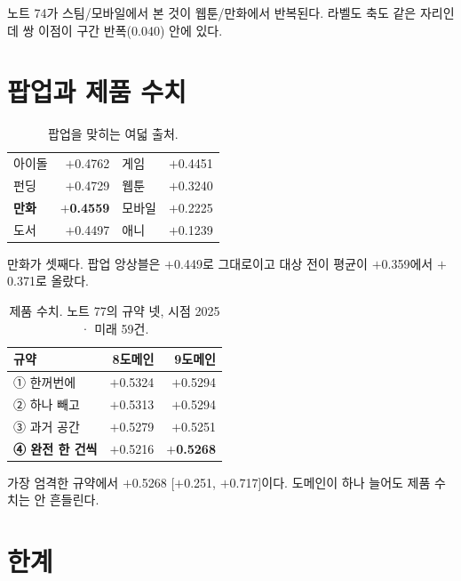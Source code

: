 \documentclass[10pt]{article}
\begin{document}
노트 74가 스팀/모바일에서 본 것이 웹툰/만화에서 반복된다. 라벨도 축도 같은
자리인데 쌍 이점이 구간 반폭(0.040) 안에 있다.


\section{팝업과 제품 수치}

\begin{table}[t]
\centering\tsize
\caption{팝업을 맞히는 여덟 출처.}
\begin{tabular}{lrlr}
\toprule
아이돌 & $+$0.4762 & 게임 & $+$0.4451 \\
펀딩 & $+$0.4729 & 웹툰 & $+$0.3240 \\
\textbf{만화} & \textbf{$+$0.4559} & 모바일 & $+$0.2225 \\
도서 & $+$0.4497 & 애니 & $+$0.1239 \\
\bottomrule
\end{tabular}
\end{table}

만화가 셋째다. 팝업 앙상블은 $+$0.449로 그대로이고 대상 전이 평균이 $+$0.359에서
$+$0.371로 올랐다.

\begin{table}[t]
\centering\tsize
\caption{제품 수치. 노트 77의 규약 넷, 시점 2025 · 미래 59건.}
\begin{tabular}{lrr}
\toprule
규약 & 8도메인 & 9도메인 \\
\midrule
① 한꺼번에 & $+$0.5324 & $+$0.5294 \\
② 하나 빼고 & $+$0.5313 & $+$0.5294 \\
③ 과거 공간 & $+$0.5279 & $+$0.5251 \\
\textbf{④ 완전 한 건씩} & $+$0.5216 & \textbf{$+$0.5268} \\
\bottomrule
\end{tabular}
\end{table}

가장 엄격한 규약에서 $+$0.5268 {[}$+$0.251, $+$0.717{]}이다. 도메인이 하나
늘어도 제품 수치는 안 흔들린다.

\section{한계}
\end{document}
